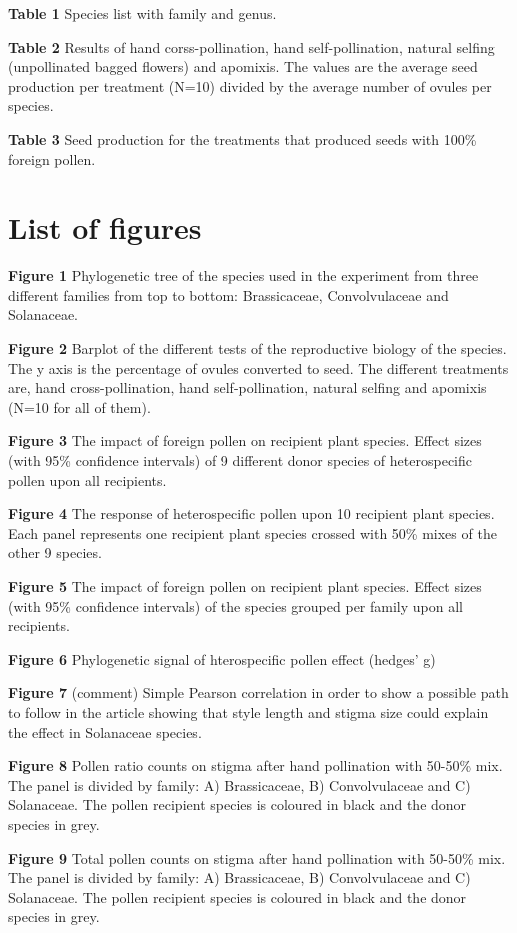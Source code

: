 \documentclass[]{article}
\begin{document}
\textbf{Table 1} Species list with family and genus.

\textbf{Table 2} Results of hand corss-pollination, hand
self-pollination, natural selfing (unpollinated bagged flowers) and
apomixis. The values are the average seed production per treatment
(N=10) divided by the average number of ovules per species.

\textbf{Table 3} Seed production for the treatments that produced seeds
with 100\% foreign pollen.

\section{List of figures}\label{list-of-figures}

\textbf{Figure 1} Phylogenetic tree of the species used in the
experiment from three different families from top to bottom:
Brassicaceae, Convolvulaceae and Solanaceae.

\textbf{Figure 2} Barplot of the different tests of the reproductive
biology of the species. The y axis is the percentage of ovules converted
to seed. The different treatments are, hand cross-pollination, hand
self-pollination, natural selfing and apomixis (N=10 for all of them).

\textbf{Figure 3} The impact of foreign pollen on recipient plant
species. Effect sizes (with 95\% confidence intervals) of 9 different
donor species of heterospecific pollen upon all recipients.

\textbf{Figure 4} The response of heterospecific pollen upon 10
recipient plant species. Each panel represents one recipient plant
species crossed with 50\% mixes of the other 9 species.

\textbf{Figure 5} The impact of foreign pollen on recipient plant
species. Effect sizes (with 95\% confidence intervals) of the species
grouped per family upon all recipients.

\textbf{Figure 6} Phylogenetic signal of hterospecific pollen effect
(hedges' g)

\textbf{Figure 7} (comment) Simple Pearson correlation in order to show
a possible path to follow in the article showing that style length and
stigma size could explain the effect in Solanaceae species.

\textbf{Figure 8} Pollen ratio counts on stigma after hand pollination
with 50-50\% mix. The panel is divided by family: A) Brassicaceae, B)
Convolvulaceae and C) Solanaceae. The pollen recipient species is
coloured in black and the donor species in grey.

\textbf{Figure 9} Total pollen counts on stigma after hand pollination
with 50-50\% mix. The panel is divided by family: A) Brassicaceae, B)
Convolvulaceae and C) Solanaceae. The pollen recipient species is
coloured in black and the donor species in grey.
\end{document}
